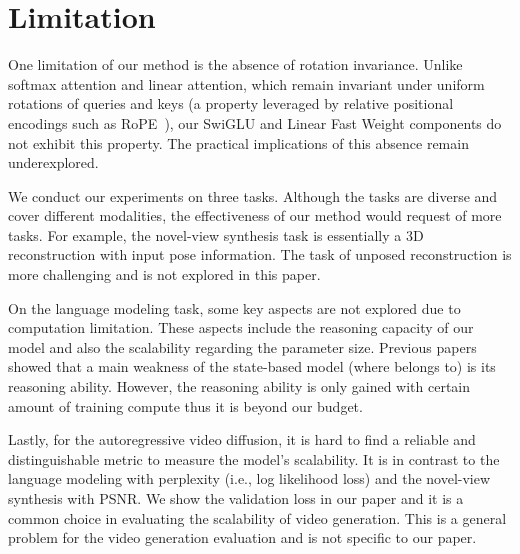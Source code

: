 

\section{Limitation}
One limitation of our method is the absence of rotation invariance. Unlike softmax attention and linear attention, which remain invariant under uniform rotations of queries and keys (a property leveraged by relative positional encodings such as RoPE~\cite{su2023roformer}), our SwiGLU and Linear Fast Weight components do not exhibit this property. The practical implications of this absence remain underexplored.

We conduct our experiments on three tasks.
Although the tasks are diverse and cover different modalities, the effectiveness of our method would request of more tasks.
For example, the novel-view synthesis task is essentially a 3D reconstruction with input pose information.
The task of unposed reconstruction is more challenging and is not explored in this paper.

On the language modeling task, some key aspects are not explored due to computation limitation.
These aspects include the reasoning capacity of our \methodname{} model and also the scalability regarding the parameter size.
Previous papers showed that a main weakness of the state-based model (where \methodname{} belongs to) is its reasoning ability.
However, the reasoning ability is only gained with certain amount of training compute thus it is beyond our budget.

Lastly, for the autoregressive video diffusion, it is hard to find a reliable and distinguishable metric to measure the model's scalability.
It is in contrast to the language modeling with perplexity (i.e., log likelihood loss) and the novel-view synthesis with PSNR.
We show the validation loss in our paper and it is a common choice in evaluating the scalability of video generation.
This is a general problem for the video generation evaluation and is not specific to our paper.




